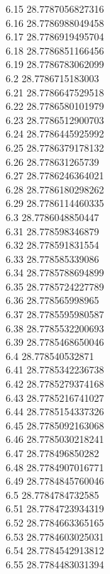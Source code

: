 {6.15	28.7787056827316\\
6.16	28.7786988049458\\
6.17	28.7786919495704\\
6.18	28.7786851166456\\
6.19	28.7786783062099\\
6.2	28.7786715183003\\
6.21	28.7786647529518\\
6.22	28.7786580101979\\
6.23	28.7786512900703\\
6.24	28.7786445925992\\
6.25	28.7786379178132\\
6.26	28.778631265739\\
6.27	28.7786246364021\\
6.28	28.7786180298262\\
6.29	28.7786114460335\\
6.3	28.7786048850447\\
6.31	28.778598346879\\
6.32	28.778591831554\\
6.33	28.778585339086\\
6.34	28.7785788694899\\
6.35	28.7785724227789\\
6.36	28.778565998965\\
6.37	28.7785595980587\\
6.38	28.7785532200693\\
6.39	28.7785468650046\\
6.4	28.778540532871\\
6.41	28.7785342236738\\
6.42	28.7785279374168\\
6.43	28.7785216741027\\
6.44	28.7785154337326\\
6.45	28.7785092163068\\
6.46	28.7785030218241\\
6.47	28.778496850282\\
6.48	28.7784907016771\\
6.49	28.7784845760046\\
6.5	28.7784784732585\\
6.51	28.7784723934319\\
6.52	28.7784663365165\\
6.53	28.7784603025031\\
6.54	28.7784542913812\\
6.55	28.7784483031394\\
}
